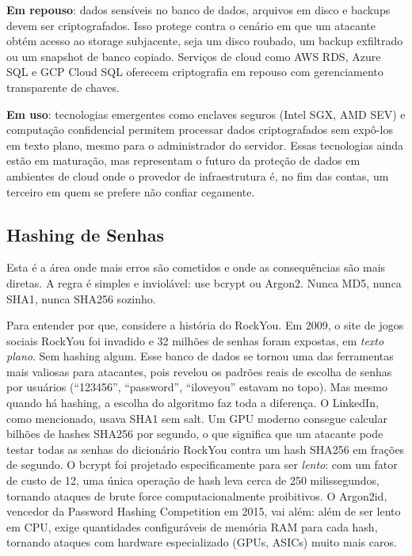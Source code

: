 \textbf{Em repouso}: dados sensíveis no banco de dados, arquivos em disco e
backups devem ser criptografados. Isso protege contra o cenário em que um
atacante obtém acesso ao storage subjacente, seja um disco roubado, um backup
exfiltrado ou um snapshot de banco copiado. Serviços de cloud como AWS RDS, Azure
SQL e GCP Cloud SQL oferecem criptografia em repouso com gerenciamento
transparente de chaves.

\textbf{Em uso}: tecnologias emergentes como enclaves seguros (Intel SGX, AMD
SEV) e computação confidencial permitem processar dados criptografados sem
expô-los em texto plano, mesmo para o administrador do servidor. Essas
tecnologias ainda estão em maturação, mas representam o futuro da proteção de
dados em ambientes de cloud onde o provedor de infraestrutura é, no fim das
contas, um terceiro em quem se prefere não confiar cegamente.

\subsection{Hashing de Senhas}

Esta é a área onde mais erros são cometidos e onde as consequências são mais
diretas. A regra é simples e inviolável: use bcrypt ou Argon2. Nunca MD5, nunca
SHA1, nunca SHA256 sozinho.

Para entender por que, considere a história do RockYou. Em 2009, o site de
jogos sociais RockYou foi invadido e 32 milhões de senhas foram expostas, em
\emph{texto plano}. Sem hashing algum. Esse banco de dados se tornou uma das
ferramentas mais valiosas para atacantes, pois revelou os padrões reais de
escolha de senhas por usuários (``123456'', ``password'', ``iloveyou'' estavam
no topo). Mas mesmo quando há hashing, a escolha do algoritmo faz toda a
diferença. O LinkedIn, como mencionado, usava SHA1 sem salt. Um GPU moderno
consegue calcular bilhões de hashes SHA256 por segundo, o que significa que um
atacante pode testar todas as senhas do dicionário RockYou contra um hash SHA256
em frações de segundo. O bcrypt foi projetado especificamente para ser
\emph{lento}: com um fator de custo de 12, uma única operação de hash leva cerca
de 250 milissegundos, tornando ataques de brute force computacionalmente
proibitivos. O Argon2id, vencedor da Password Hashing Competition em 2015, vai
além: além de ser lento em CPU, exige quantidades configuráveis de memória RAM
para cada hash, tornando ataques com hardware especializado (GPUs, ASICs)
muito mais caros.

